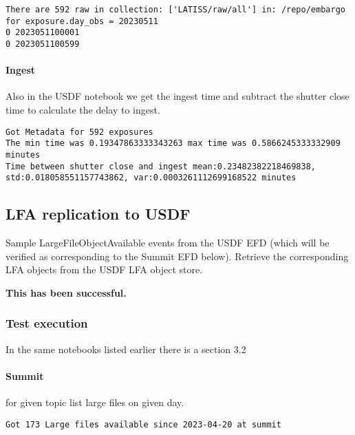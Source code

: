 \begin{lstlisting}
There are 592 raw in collection: ['LATISS/raw/all'] in: /repo/embargo for exposure.day_obs = 20230511
0 2023051100001
0 2023051100599
\end{lstlisting}

\paragraph {Ingest} \label{sec:ingest}
Also in the USDF notebook we get the ingest time and subtract the shutter close time to calculate the
delay to ingest.
\begin{lstlisting}
Got Metadata for 592 exposures
The min time was 0.19347863333343263 max time was 0.5866245333332909 minutes
Time between shutter close and ingest mean:0.23482382218469838, std:0.018058551157743862, var:0.0003261112699168522 minutes
\end{lstlisting}

\subsection{LFA replication to USDF }
Sample LargeFileObjectAvailable events from the USDF EFD (which will be verified as corresponding to the Summit EFD below).
Retrieve the corresponding LFA objects from the USDF LFA object store.

\textbf{This has been successful.}
\subsubsection{Test execution}
In the same notebooks  listed earlier there is a section 3.2

\paragraph{Summit} for given topic list large files on given day.
\begin{lstlisting}
Got 173 Large files available since 2023-04-20 at summit
\end{lstlisting}

